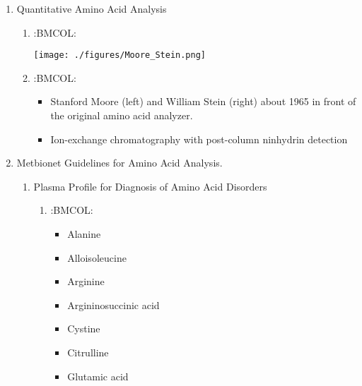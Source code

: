 \documentclass{scrartcl}
\begin{document}
\begin{enumerate}
\item Quantitative Amino Acid Analysis
\label{sec:orgb96a714}
\begin{enumerate}
\item :BMCOL:
\label{sec:org15c9e0a}
\begin{center}
\texttt{[image: ./figures/Moore\_Stein.png]}
\end{center}

\item :BMCOL:
\label{sec:org3c50e92}
\begin{itemize}
\item Stanford Moore (left) and William Stein (right) about 1965 in front
of the original amino acid analyzer.
\item Ion-exchange chromatography with post-column ninhydrin detection
\end{itemize}
\end{enumerate}

\item Metbionet Guidelines for Amino Acid Analysis.
\label{sec:org1061b98}

\begin{enumerate}
\item Plasma Profile for Diagnosis of Amino Acid Disorders
\label{sec:org58cd2ec}

\begin{enumerate}
\item :BMCOL:
\label{sec:orga9a2ecc}
\begin{itemize}
\item Alanine
\item Alloisoleucine
\item Arginine
\item Argininosuccinic acid
\item Cystine
\item Citrulline
\item Glutamic acid
\end{itemize}



\end{enumerate}
\end{enumerate}
\end{enumerate}
\end{document}
